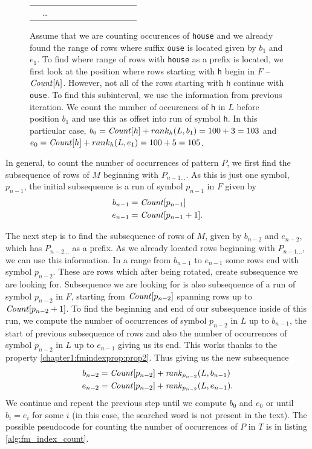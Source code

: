 \begin{figure}
{\begin{tabular}{c|c|l|l|l|l|l|l|l|l|l|l|}
	                & \ldots     &   &  &   &   &   &   &   &   &   &   \\ \cline{5-10}\cline{2-3}\cline{12-12}
	\end{tabular}
	}
	\caption[TODO]{Assume that we are counting occurences of \texttt{house} and we already found the
	range of rows where suffix \texttt{ouse} is located given by $b_1$ and $e_1$. To find where range
	of rows with \texttt{house} as a prefix is located, we first look at the position where rows starting with
	\texttt{h} begin in $F$ -- $\mathit{Count}[h]$. However, not all of the rows starting with \texttt{h} continue with
	\texttt{ouse}. To find this subinterval, we use the information from previous iteration. We count
	the number of occurences of \texttt{h} in $L$ before position $b_1$ and use this as offset into run of
	symbol \texttt{h}. In this particular case, $b_0 = \mathit{Count}[h] + rank_h(L, b_1) = 100 + 3 = 103$ and
	$e_0 = \mathit{Count}[h] + rank_h(L, e_1) = 100 + 5 = 105$.
	}
	\label{tab:fm_index_example}
\end{figure}

In general, to count the number of occurrences of pattern $P$, we first find the subsequence of rows of $M$
beginning with $P_{n-1\ldots}$. As this is just one symbol, $p_{n-1}$, the initial subsequence is a run
of symbol $p_{n-1}$ in $F$ given by
\begin{align*}
	b_{n-1}&=\mathit{Count}[p_{n-1}] \\
	e_{n-1}&=\mathit{Count}[p_{n-1}+1].\\
\end{align*}

The next step is to find the subsequence of rows of $M$, given by $b_{n-2}$ and $e_{n-2}$, which has
$P_{n-2\ldots}$ as a prefix. As we already located rows beginning with $P_{n-1\ldots}$, we can use
this information. In a range from $b_{n-1}$ to $e_{n-1}$ some rows end with symbol $p_{n-2}$. These
are rows which after being rotated, create subsequence we are looking for. Subsequence we are looking
for is also subsequence of a run of symbol $p_{n-2}$ in $F$, starting from $\mathit{Count}[p_{n-2}]$ spanning
rows up to $\mathit{Count}[p_{n-2}+1]$. To find the beginning and end of our subsequence inside of this run, we
compute the number of occurrences of symbol $p_{n-2}$ in $L$ up to $b_{n-1}$, the start of previous
subsequence of rows and also the number of occurrences of symbol $p_{n-2}$ in $L$ up to $e_{n-1}$
giving us its end. This works thanks to the property \ref{chapter1:fmindexprop:prop2}. Thus giving us the
new subsequence
\begin{align*}
	b_{n-2}&=\mathit{Count}[p_{n-2}] + \mathit{rank}_{p_{n-2}}(L, b_{n-1}) \\
	e_{n-2}&=\mathit{Count}[p_{n-2}] + \mathit{rank}_{p_{n-2}}(L, e_{n-1}).\\
\end{align*}
We continue and repeat the previous step until we compute $b_0$ and $e_0$ or until $b_i=e_i$ for some $i$
(in this case, the searched word is not present in the text). The possible pseudocode for counting the number
of occurrences of $P$ in $T$ is in listing \ref{alg:fm_index_count}.

